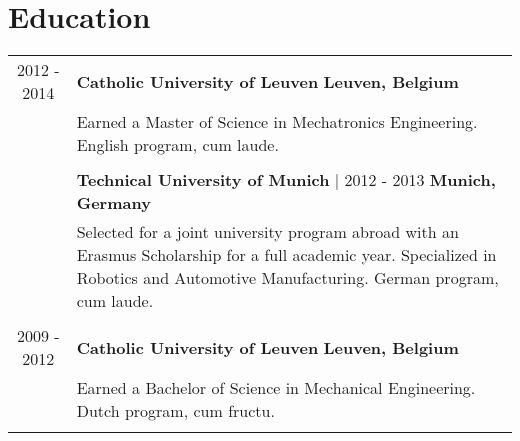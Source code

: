 \documentclass[a4paper,10pt]{article}
\begin{document}
\section{Education}
\begin{tabularx}{\textwidth}{cX}
2012 - 2014 & \textbf{Catholic University of Leuven} \hfill \textbf{Leuven, Belgium} \\
& Earned a Master of Science in Mechatronics Engineering. English program, cum laude. \\ %
& \\
& \textbf{Technical University of Munich} | 2012 - 2013 \hfill \textbf{Munich, Germany} \\
& Selected for a joint university program abroad with an Erasmus Scholarship for a full academic year.
Specialized in Robotics and Automotive Manufacturing. German program, cum laude. \\
& \\
2009 - 2012 &  \textbf{Catholic University of Leuven} \hfill \textbf{Leuven, Belgium} \\
& Earned a Bachelor of Science in Mechanical Engineering. Dutch program, cum fructu. \\ %
& \\
\end{tabularx}
\end{document}
